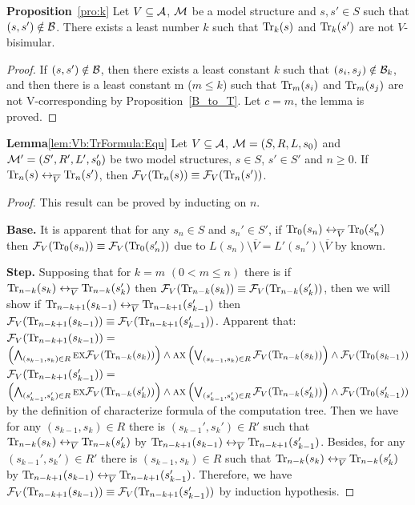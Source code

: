 \documentclass{article}
\begin{document}
\textbf{Proposition}~\ref{pro:k}   Let $V\subseteq {\cal A}$, ${\cal M}$ be a model structure and $s,s'\in S$
  such that $(s,s')\notin \cal B$.
  There exists a least number $k$ such that
  $\textrm{Tr}_k(s)$ and $\textrm{Tr}_k(s')$ are not $V$-bisimular.\\
\begin{proof}
If $(s,s') \notin \cal B$, then there exists a least constant $k$ such that $(s_i, s_j) \notin {\cal B}_k$, and then there is a least constant m ($m \leq k$) such that $\textrm{Tr}_m(s_i)$ and $\textrm{Tr}_m(s_j)$ are not V-corresponding by Proposition~\ref{B_to_T}. Let $c=m$, the lemma is proved.
\end{proof}









\textbf{Lemma}\ref{lem:Vb:TrFormula:Equ} Let $V\subseteq {\cal A}$, ${\cal M}=(S, R, L, s_0)$ and ${\cal M}'=(S', R', L', s_0')$ be two model structures,
$s\in S$, $s'\in S'$ and $n\ge 0$. If $\textrm{Tr}_n(s) \leftrightarrow_{\overline V} \textrm{Tr}_n(s')$, then ${\cal F}_V(\textrm{Tr}_n(s)) \equiv {\cal F}_V(\textrm{Tr}_n(s'))$.\\
\begin{proof}
This result can be proved by inducting on $n$.

\textbf{Base.} It is apparent that for any $s_n\in S$ and $s_n' \in S'$, if $\textrm{Tr}_0(s_n) \leftrightarrow_{\overline V} \textrm{Tr}_0(s_n')$ then ${\cal F}_V(\textrm{Tr}_0(s_n)) \equiv {\cal F}_V(\textrm{Tr}_0(s_n'))$ due to $L(s_n) \setminus \overline V = L'(s_n') \setminus \overline V$ by known.

\textbf{Step.} Supposing that for $k=m$ $(0< m \leq n)$ there is if $\textrm{Tr}_{n-k}(s_k) \leftrightarrow_{\overline V} \textrm{Tr}_{n-k}(s_k')$ then ${\cal F}_V(\textrm{Tr}_{n-k}(s_k)) \equiv {\cal F}_V(\textrm{Tr}_{n-k}(s_k'))$, then we will show if $\textrm{Tr}_{n-k+1}(s_{k-1}) \leftrightarrow_{\overline V} \textrm{Tr}_{n-k+1}(s_{k-1}')$ then ${\cal F}_V(\textrm{Tr}_{n-k+1}(s_{k-1})) \equiv {\cal F}_V(\textrm{Tr}_{n-k+1}(s_{k-1}'))$. Apparent that:\\
 ${\cal F}_V(\textrm{Tr}_{n-k+1}(s_{k-1})) =$
 $\left(\bigwedge_{(s_{k-1},s_k)\in R}
    \textsc{e} \textsc{x} {\cal F}_V(\textrm{Tr}_{n-k}(s_k))\right)
    \wedge \textsc{a} \textsc{x}\left(\bigvee_{(s_{k-1},s_k)\in R}
    {\cal F}_V(\textrm{Tr}_{n-k}(s_k) )\right)
    \wedge {\cal F}_V(\textrm{Tr}_0(s_{k-1}))$\\
 ${\cal F}_V(\textrm{Tr}_{n-k+1}(s_{k-1}')) =$
 $\left(\bigwedge_{(s_{k-1}',s_k')\in R}
    \textsc{e} \textsc{x} {\cal F}_V(\textrm{Tr}_{n-k}(s_k'))\right)
    \wedge \textsc{a} \textsc{x}\left(\bigvee_{(s_{k-1}',s_k')\in R}
    {\cal F}_V(\textrm{Tr}_{n-k}(s_k') )\right)
    \wedge {\cal F}_V(\textrm{Tr}_0(s_{k-1}'))$ by the definition of characterize formula of the computation tree.
 Then we have for any $(s_{k-1}, s_k) \in R$ there is $(s_{k-1}', s_k') \in R'$ such that $\textrm{Tr}_{n-k}(s_k) \leftrightarrow_{\overline V} \textrm{Tr}_{n-k}(s_k')$ by $\textrm{Tr}_{n-k+1}(s_{k-1}) \leftrightarrow_{\overline V} \textrm{Tr}_{n-k+1}(s_{k-1}')$. Besides, for any $(s_{k-1}', s_k') \in R'$ there is $(s_{k-1}, s_k) \in R$ such that $\textrm{Tr}_{n-k}(s_k) \leftrightarrow_{\overline V} \textrm{Tr}_{n-k}(s_k')$ by $\textrm{Tr}_{n-k+1}(s_{k-1}) \leftrightarrow_{\overline V} \textrm{Tr}_{n-k+1}(s_{k-1}')$.
 Therefore, we have ${\cal F}_V(\textrm{Tr}_{n-k+1}(s_{k-1})) \equiv {\cal F}_V(\textrm{Tr}_{n-k+1}(s_{k-1}'))$ by induction hypothesis.
\end{proof}
\end{document}
